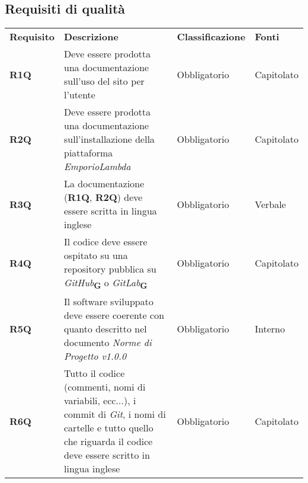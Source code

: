 \subsection{Requisiti di qualità}
\begin{center}
    \centering
    \renewcommand{\arraystretch}{1.8}
    \label{tab:RequisitiQualita}
    \begin{longtable}[!h]{p{50px} p{200px} p{100px} p{50px}}
        \rowcolor{logo!70} \textbf{Requisito} & \textbf{Descrizione}                                                                                                                                                 & \textbf{Classificazione} & \textbf{Fonti} \\
        \textbf{R1Q}                          & Deve essere prodotta una documentazione sull'uso del sito per l'utente                                                                                               & Obbligatorio             & Capitolato     \\
        \textbf{R2Q}                          & Deve essere prodotta una documentazione sull'installazione della piattaforma \textit{EmporioLambda}                                                                                  & Obbligatorio             & Capitolato     \\
        \textbf{R3Q}                          & La documentazione (\textbf{R1Q}, \textbf{R2Q}) deve essere scritta in lingua inglese                                                                                                            & Obbligatorio             & Verbale     \\
        \textbf{R4Q}                          & Il codice deve essere ospitato su una repository pubblica su \textit{GitHub}\textsubscript{\textbf{G}} o \textit{GitLab}\textsubscript{\textbf{G}}                                                              & Obbligatorio             & Capitolato     \\
        \textbf{R5Q}                          & Il software sviluppato deve essere coerente con quanto descritto nel documento \textit{Norme di Progetto v1.0.0}                                                     & Obbligatorio             & Interno        \\
        \textbf{R6Q}                          & Tutto il codice (commenti, nomi di variabili, ecc...), i commit di \textit{Git}, i nomi di cartelle e tutto quello che riguarda il codice deve essere scritto in lingua inglese & Obbligatorio             & Capitolato     \\

\end{longtable}
\end{center}
